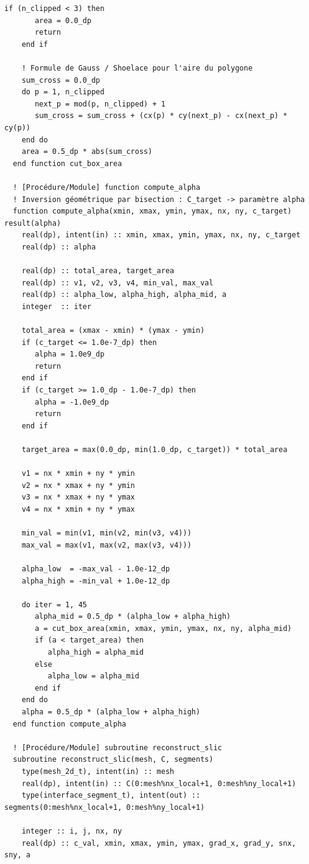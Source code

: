\documentclass[10pt,a4paper,oneside]{book}
\begin{document}
\begin{lstlisting}[language={[95]Fortran}]
    if (n_clipped < 3) then
       area = 0.0_dp
       return
    end if

    ! Formule de Gauss / Shoelace pour l'aire du polygone
    sum_cross = 0.0_dp
    do p = 1, n_clipped
       next_p = mod(p, n_clipped) + 1
       sum_cross = sum_cross + (cx(p) * cy(next_p) - cx(next_p) * cy(p))
    end do
    area = 0.5_dp * abs(sum_cross)
  end function cut_box_area

  ! [Procédure/Module] function compute_alpha
  ! Inversion géométrique par bisection : C_target -> paramètre alpha
  function compute_alpha(xmin, xmax, ymin, ymax, nx, ny, c_target) result(alpha)
    real(dp), intent(in) :: xmin, xmax, ymin, ymax, nx, ny, c_target
    real(dp) :: alpha

    real(dp) :: total_area, target_area
    real(dp) :: v1, v2, v3, v4, min_val, max_val
    real(dp) :: alpha_low, alpha_high, alpha_mid, a
    integer  :: iter

    total_area = (xmax - xmin) * (ymax - ymin)
    if (c_target <= 1.0e-7_dp) then
       alpha = 1.0e9_dp
       return
    end if
    if (c_target >= 1.0_dp - 1.0e-7_dp) then
       alpha = -1.0e9_dp
       return
    end if

    target_area = max(0.0_dp, min(1.0_dp, c_target)) * total_area

    v1 = nx * xmin + ny * ymin
    v2 = nx * xmax + ny * ymin
    v3 = nx * xmax + ny * ymax
    v4 = nx * xmin + ny * ymax

    min_val = min(v1, min(v2, min(v3, v4)))
    max_val = max(v1, max(v2, max(v3, v4)))

    alpha_low  = -max_val - 1.0e-12_dp
    alpha_high = -min_val + 1.0e-12_dp

    do iter = 1, 45
       alpha_mid = 0.5_dp * (alpha_low + alpha_high)
       a = cut_box_area(xmin, xmax, ymin, ymax, nx, ny, alpha_mid)
       if (a < target_area) then
          alpha_high = alpha_mid
       else
          alpha_low = alpha_mid
       end if
    end do
    alpha = 0.5_dp * (alpha_low + alpha_high)
  end function compute_alpha

  ! [Procédure/Module] subroutine reconstruct_slic
  subroutine reconstruct_slic(mesh, C, segments)
    type(mesh_2d_t), intent(in) :: mesh
    real(dp), intent(in) :: C(0:mesh%nx_local+1, 0:mesh%ny_local+1)
    type(interface_segment_t), intent(out) :: segments(0:mesh%nx_local+1, 0:mesh%ny_local+1)

    integer :: i, j, nx, ny
    real(dp) :: c_val, xmin, xmax, ymin, ymax, grad_x, grad_y, snx, sny, a


\end{lstlisting}
\end{document}

